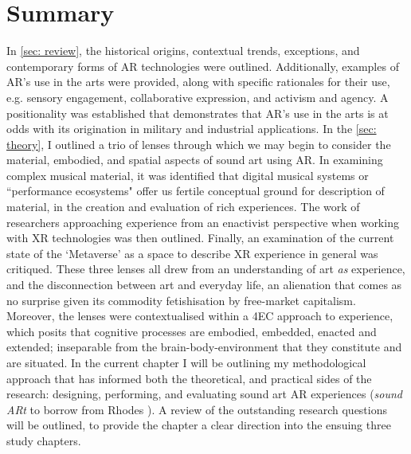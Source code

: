 \section{Summary}\label{sec: method-summary}
In \autoref{sec: review}, the historical origins, contextual trends, exceptions, and contemporary forms of AR technologies were outlined. Additionally, examples of AR's use in the arts were provided, along with specific rationales for their use, e.g. sensory engagement, collaborative expression, and activism and agency. A positionality was established that demonstrates that AR's use in the arts is at odds with its origination in military and industrial applications. In the \autoref{sec: theory}, I outlined a trio of lenses through which we may begin to consider the material, embodied, and spatial aspects of sound art using AR. In examining complex musical material, it was identified that digital musical systems or ``performance ecosystems" offer us fertile conceptual ground for description of material, in the creation and evaluation of rich experiences. The work of researchers approaching experience from an enactivist perspective when working with XR technologies was then outlined. Finally, an examination of the current state of the `Metaverse' as a space to describe XR experience in general was critiqued. These three lenses all drew from an understanding of art \textit{as} experience, and the disconnection between art and everyday life, an alienation that comes as no surprise given its commodity fetishisation by free-market capitalism. Moreover, the lenses were contextualised within a 4EC approach to experience, which posits that cognitive processes are embodied, embedded, enacted and extended; inseparable from the brain-body-environment that they constitute and are situated. In the current chapter I will be outlining my methodological approach that has informed both the theoretical, and practical sides of the research: designing, performing, and evaluating sound art AR experiences (\textit{sound ARt} to borrow from Rhodes \citeyearpar{rhodes2018}). A review of the outstanding research questions will be outlined, to provide the chapter a clear direction into the ensuing three study chapters.

\begin{enumerate}
    \RQmedium
    \RQexperience
\end{enumerate}

